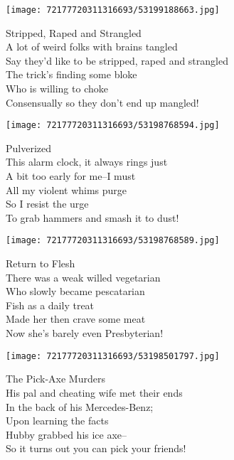 \documentclass[10pt,letterpaper]{article}
\begin{document}
\begin{center}
\texttt{[image: 72177720311316693/53199188663.jpg]}
\end{center}

\begin{center}
Stripped, Raped and Strangled\\
\vskip 0.2in
A lot of weird folks with brains tangled\\
Say they'd like to be stripped, raped and strangled\\
The trick's finding some bloke\\
Who is willing to choke\\
Consensually so they don't end up mangled!\\
\end{center}
\pagebreak

\begin{center}\texttt{[image: 72177720311316693/53198768594.jpg]}
\end{center}
\begin{center}
Pulverized\\
\vskip 0.2in
This alarm clock, it always rings just\\
A bit too early for me--I must\\
All my violent whims purge\\
So I resist the urge\\
To grab hammers and smash it to dust!\\
\end{center}
\pagebreak

\begin{center}
\texttt{[image: 72177720311316693/53198768589.jpg]}
\end{center}

\begin{center}
Return to Flesh\\
\vskip 0.2in
There was a weak willed vegetarian\\
Who slowly became pescatarian\\
Fish as a daily treat\\
Made her then crave some meat\\
Now she's barely even Presbyterian!\\
\end{center}
\pagebreak

\begin{center}\texttt{[image: 72177720311316693/53198501797.jpg]}
\end{center}
\begin{center}
The Pick-Axe Murders\\
\vskip 0.2in
His pal and cheating wife met their ends\\
In the back of his Mercedes-Benz;\\
Upon learning the facts\\
Hubby grabbed his ice axe--\\
So it turns out you can pick your friends!\\
\end{center}
\pagebreak
\end{document}
